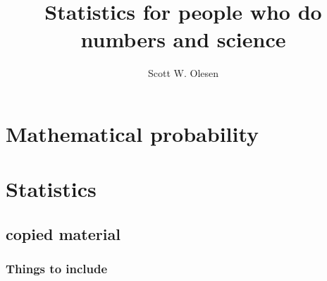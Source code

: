 \documentclass{book}
\title{Statistics for people who do numbers and science}
\author{Scott W. Olesen}
\begin{document}
\maketitle

\frontmatter



\mainmatter



\part{Mathematical probability}




\part{Statistics}





\chapter{copied material}

\section{Things to include}\label{things-to-include}
\end{document}
